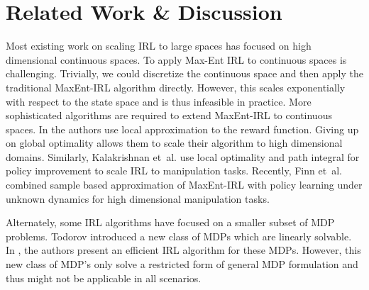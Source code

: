 \documentclass{article}
\begin{document}


\section{Related Work \& Discussion}

Most existing work on scaling IRL to large spaces has focused on high dimensional continuous spaces. 
To apply Max-Ent IRL to continuous spaces is challenging. Trivially, we could discretize the continuous space and then apply the traditional MaxEnt-IRL algorithm directly. However, this scales exponentially with respect to the state space and is thus infeasible in practice. More sophisticated algorithms are required to extend MaxEnt-IRL to continuous spaces. 
In \cite{levine2012continuous} the authors use local approximation to the reward function. Giving up on global optimality allows them to scale their algorithm to high dimensional domains. Similarly, Kalakrishnan et~al.  use local optimality and path integral for policy improvement to scale IRL to manipulation tasks. Recently, Finn et~al.  combined sample based approximation of MaxEnt-IRL with policy learning under unknown dynamics for high dimensional manipulation tasks.

Alternately, some IRL algorithms have focused on a smaller subset of MDP problems. Todorov  introduced a new class of MDPs which are linearly solvable. In \cite{dvijotham2010inverse}, the authors present an efficient IRL algorithm for these MDPs. However, this new class of MDP's only solve a restricted form of general MDP formulation and thus might not be applicable in all scenarios. 

\end{document}
